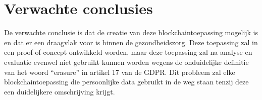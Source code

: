 \section{Verwachte conclusies}
\label{sec:verwachte_conclusies}

De verwachte conclusie is dat de creatie van deze blockchaintoepassing mogelijk is en dat er een draagvlak voor is binnen de gezondheidszorg. Deze toepassing zal in een proof-of-concept ontwikkeld worden, maar deze toepassing zal na analyse en evaluatie evenwel niet gebruikt kunnen worden wegens de onduidelijke definitie van het woord ``erasure'' in artikel 17 van de GDPR. Dit probleem zal elke blockchaintoepassing die persoonlijke data gebruikt in de weg staan tenzij deze een duidelijkere omschrijving krijgt.

